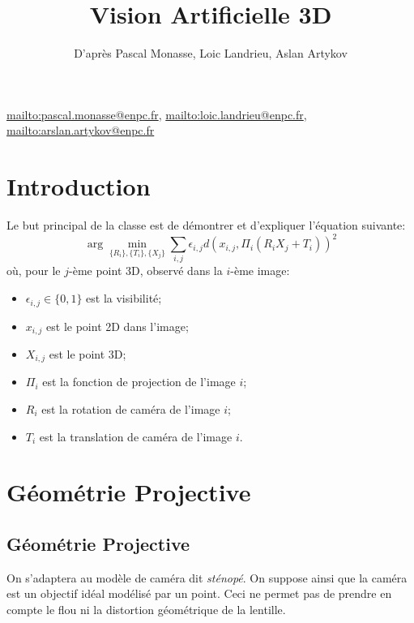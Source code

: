 \documentclass[info, math]{mpb-cours}
\title{Vision Artificielle 3D}
\author{D'après Pascal Monasse, Loic Landrieu, Aslan Artykov}
\begin{document}
\bettertitle
\url{mailto:pascal.monasse@enpc.fr}, \url{mailto:loic.landrieu@enpc.fr}, \url{mailto:arslan.artykov@enpc.fr}

\section*{Introduction}
\noindent Le but principal de la classe est de démontrer et d'expliquer l'équation suivante:
\begin{equation*}
	\arg \min_{\{R_{i}\}, \{T_{i}\}, \{X_{j}\}} \sum_{i, j} \epsilon_{i, j}d\left(x_{i, j}, \Pi_{i}(R_{i}X_{j} + T_{i})\right)^{2}
\end{equation*}
où, pour le $j$-ème point 3D, observé dans la $i$-ème image:
\begin{itemize}
	\item $\epsilon_{i, j} \in \{0, 1\}$ est la visibilité;
	\item $x_{i, j}$ est le point 2D dans l'image;
	\item $X_{i, j}$ est le point 3D;
	\item $\Pi_{i}$ est la fonction de projection de l'image $i$;
	\item $R_{i}$ est la rotation de caméra de l'image $i$;
	\item $T_{i}$ est la translation de caméra de l'image $i$.
\end{itemize}

\section{Géométrie Projective}
\subsection{Géométrie Projective}
On s'adaptera au modèle de caméra dit \emph{sténopé}.
On suppose ainsi que la caméra est un objectif idéal modélisé par un point.
Ceci ne permet pas de prendre en compte le flou ni la distortion géométrique de la lentille.
\end{document}
